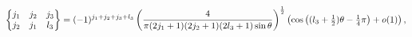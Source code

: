 \[\begin{Bmatrix}j_{1}&j_{2}&j_{3}\\
j_{2}&j_{1}&l_{3}\end{Bmatrix}=(-1)^{j_{1}+j_{2}+j_{3}+l_{3}}\*\left(\frac{4}{%
\pi(2j_{1}+1)(2j_{2}+1)(2l_{3}+1)\mathop{\sin\/}\nolimits\theta}\right)^{\frac%
{1}{2}}\*\left(\mathop{\cos\/}\nolimits\left((l_{3}+\tfrac{1}{2})\theta-\tfrac%
{1}{4}\pi\right)+\mathop{o\/}\nolimits\!\left(1\right)\right),\]